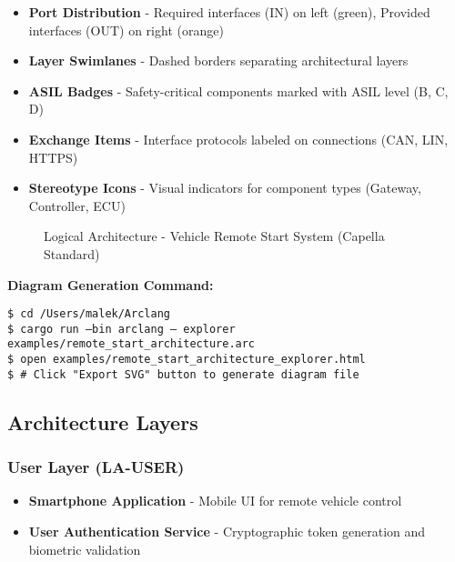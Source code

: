 \documentclass[11pt,a4paper]{article}
\begin{document}
\begin{itemize}[leftmargin=*]
    \item \textbf{Port Distribution} - Required interfaces (IN) on left (green), Provided interfaces (OUT) on right (orange)
    \item \textbf{Layer Swimlanes} - Dashed borders separating architectural layers
    \item \textbf{ASIL Badges} - Safety-critical components marked with ASIL level (B, C, D)
    \item \textbf{Exchange Items} - Interface protocols labeled on connections (CAN, LIN, HTTPS)
    \item \textbf{Stereotype Icons} - Visual indicators for component types (Gateway, Controller, ECU)
\end{itemize}

\begin{landscape}
\begin{figure}[p]
    \centering
    
    \caption{Logical Architecture - Vehicle Remote Start System (Capella Standard)}
    \label{fig:logical_arch}
\end{figure}
\end{landscape}

\textbf{Diagram Generation Command:}
\begin{tcolorbox}[colback=codebg,colframe=black]
\texttt{\$ cd /Users/malek/Arclang}\\
\texttt{\$ cargo run --bin arclang -- explorer examples/remote\_start\_architecture.arc}\\
\texttt{\$ open examples/remote\_start\_architecture\_explorer.html}\\
\texttt{\$ \# Click "Export SVG" button to generate diagram file}
\end{tcolorbox}

\subsection{Architecture Layers}

\subsubsection{User Layer (LA-USER)}
\begin{itemize}[leftmargin=*]
    \item \textbf{Smartphone Application} - Mobile UI for remote vehicle control
    \item \textbf{User Authentication Service} - Cryptographic token generation and biometric validation
\end{itemize}
\end{document}
